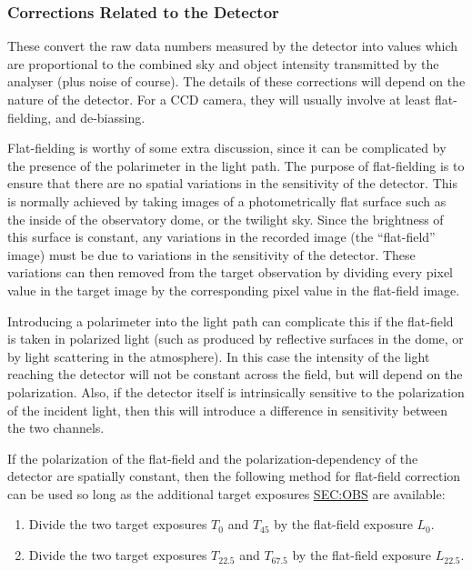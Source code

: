 \subsubsection{\label{SEC:DETCOR}Corrections Related to the Detector}
These convert the raw data numbers measured by the detector into values
which are proportional to the combined sky and object intensity
transmitted by the analyser (plus noise of course). The details of these
corrections will depend on the nature of the detector. For a CCD camera,
they will usually involve at least flat-fielding, and de-biassing. 

Flat-fielding is worthy of some extra discussion, since it can be
complicated by the presence of the polarimeter in the light path. The
purpose of flat-fielding is to ensure that there are no spatial
variations in the sensitivity of the detector. This is normally achieved
by taking images of a photometrically flat surface such as the inside of
the observatory dome, or the twilight sky. Since the brightness of this
surface is constant, any variations in the recorded image (the
``flat-field'' image) must be due to variations in the sensitivity of the
detector. These variations can then removed from the target observation
by dividing every pixel value in the target image by the corresponding 
pixel value in the flat-field image.

Introducing a polarimeter into the light path can complicate this if the
flat-field is taken in polarized light (such as produced by reflective
surfaces in the dome, or by light scattering in the atmosphere). In this
case the intensity of the light reaching the detector will not be
constant across the field, but will depend on the polarization. Also, if
the detector itself is intrinsically sensitive to the polarization of
the incident light, then this will introduce a difference in sensitivity
between the two channels.

If the polarization of the flat-field and the polarization-dependency 
of the detector are spatially constant, then the following method for
flat-field correction can be used so long as the additional target
exposures \hyperref{$T_{45}$ and $T_{67.5}$}{$T_{45}$ and $T_{67.5}$ 
(see section }{)}{SEC:OBS} are available:

\begin{enumerate}

\item Divide the two target exposures $T_{0}$ and $T_{45}$ by the flat-field
exposure $L_{0}$.

\item Divide the two target exposures $T_{22.5}$ and $T_{67.5}$ by the 
flat-field exposure $L_{22.5}$.

\end{enumerate}

